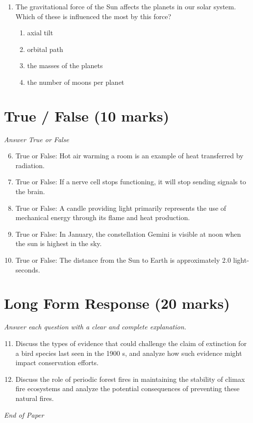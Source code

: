 \documentclass[12pt]{article}
\begin{document}
\begin{enumerate}[label=\arabic*.]
\begin{enumerate}[label=(\alph*)]
    \item an increase in the motion of the copper particles
    \item a decrease in the distance between the copper particles
\end{enumerate}
\item The gravitational force of the Sun affects the planets in our solar system. Which of these is influenced the most by this force?
\begin{enumerate}[label=(\alph*)]
    \item axial tilt
    \item orbital path
    \item the masses of the planets
    \item the number of moons per planet
\end{enumerate}
\end{enumerate}

\section*{True / False (10 marks)}
\textit{Answer True or False}
\begin{enumerate}[label=\arabic*.]
\setcounter{enumi}{5}
\item True or False: Hot air warming a room is an example of heat transferred by radiation.
\item True or False: If a nerve cell stops functioning, it will stop sending signals to the brain.
\item True or False: A candle providing light primarily represents the use of mechanical energy through its flame and heat production.
\item True or False: In January, the constellation Gemini is visible at noon when the sun is highest in the sky.
\item True or False: The distance from the Sun to Earth is approximately 2.0 light-seconds.
\end{enumerate}

\section*{Long Form Response (20 marks)}
\textit{Answer each question with a clear and complete explanation.}
\begin{enumerate}[label=\arabic*.]
\setcounter{enumi}{10}
\item Discuss the types of evidence that could challenge the claim of extinction for a bird species last seen in the 1900 s, and analyze how such evidence might impact conservation efforts.
\item Discuss the role of periodic forest fires in maintaining the stability of climax fire ecosystems and analyze the potential consequences of preventing these natural fires.
\end{enumerate}

\vfill
\noindent\textit{End of Paper}
\end{document}
